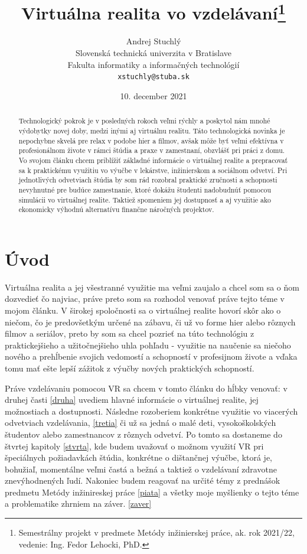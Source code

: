 \documentclass[10pt,twoside,slovak,a4paper]{article}
\title{Virtuálna realita vo vzdelávaní\thanks{Semestrálny projekt v predmete Metódy inžinierskej práce, ak. rok 2021/22, vedenie: Ing. Fedor Lehocki, PhD.}}
\author{Andrej Stuchlý\\[2pt]
	{\small Slovenská technická univerzita v Bratislave}\\
	{\small Fakulta informatiky a informačných technológií}\\
	{\small \texttt{xstuchly@stuba.sk}}
	}
\date{\small 10. december 2021}
\begin{document}
\maketitle

\begin{abstract}
Technologický pokrok je v posledných rokoch veľmi rýchly a poskytol nám mnohé výdobytky novej doby, medzi inými aj virtuálnu realitu. Táto technologická novinka je nepochybne skvelá pre relax v podobe hier a filmov, avšak môže byť veľmi efektívna v profesionálnom živote v rámci štúdia a praxe v zamestnaní, obzvlášť pri práci z domu. Vo svojom článku chcem priblížiť základné informácie o virtuálnej realite a prepracovať sa k  praktickému využitiu vo výučbe v lekárstve, inžinierskom a sociálnom odvetví. Pri jednotlivých odvetviach štúdia by som rád rozobral praktické zručnosti a schopnosti nevyhnutné pre budúce zamestnanie, ktoré dokážu študenti nadobudnúť pomocou simulácii vo virtuálnej realite. Taktiež spomeniem jej dostupnosť a aj využitie ako ekonomicky výhodnú alternatívu finančne náročných projektov. 
\end{abstract}


\section{Úvod}
Virtuálna realita a jej všestranné využitie ma veľmi zaujalo a chcel som sa o ňom dozvedieť čo najviac, práve preto som sa rozhodol venovať práve tejto téme v mojom článku. V širokej spoločnosti sa o virtuálnej realite hovorí skôr ako o niečom, čo je predovšetkým určené na zábavu, či už vo forme hier alebo rôznych filmov a seriálov, preto by som sa chcel pozrieť na túto technológiu z praktickejšieho a užitočnejšieho uhla pohľadu - využitie na naučenie sa niečoho nového a prehĺbenie svojich vedomostí a schopností v profesijnom živote a vďaka tomu mať ešte lepší zážitok z výučby nových praktických schopností.

Práve vzdelávaniu pomocou VR sa chcem v tomto článku do hĺbky venovať: v druhej časti \ref{druha} uvediem hlavné informácie o virtuálnej realite, jej možnostiach a dostupnosti. Následne rozoberiem konkrétne využitie vo viacerých odvetviach vzdelávania, \ref{tretia} či už sa jedná o malé deti, vysokoškolských študentov alebo zamestnancov z rôznych odvetví. Po tomto sa dostaneme do štvrtej kapitoly \ref{stvrta}, kde budem uvažovať o možnom využití VR pri špeciálnych požiadavkách štúdia, konkrétne o dištančnej výučbe, ktorá je, bohužiaľ, momentálne veľmi častá a bežná a taktiež o vzdelávaní zdravotne znevýhodnených ľudí. Nakoniec budem reagovať na určité témy z prednášok predmetu Metódy inžinireskej práce \ref{piata} a všetky moje myšlienky o tejto téme a problematike zhrniem na záver. \ref{zaver}
\end{document}
